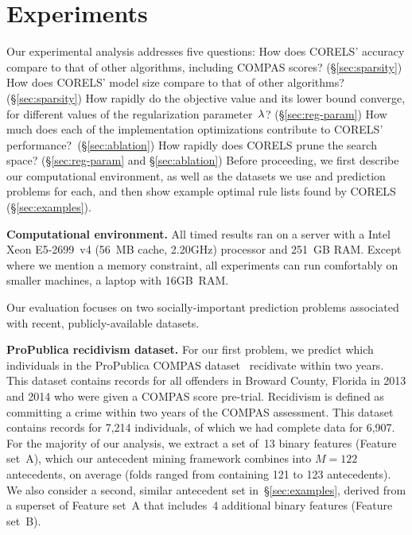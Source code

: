 \section{Experiments}
\label{sec:experiments}

Our experimental analysis addresses five questions:
%
How does CORELS' accuracy compare to that of other algorithms,
including COMPAS scores? (\S\ref{sec:sparsity})
%
How does CORELS' model size compare to that of other algorithms? (\S\ref{sec:sparsity})
%
How rapidly do the objective value and its lower bound converge,
for different values of the regularization parameter~${\lambda}$? (\S\ref{sec:reg-param})
%
How much does each of the implementation optimizations contribute to CORELS' performance?~(\S\ref{sec:ablation})
%
How rapidly does CORELS prune the search space? (\S\ref{sec:reg-param} and \S\ref{sec:ablation})
%
Before proceeding, we first describe our computational environment,
as well as the datasets we use and prediction problems for each,
and then show example optimal rule lists found by CORELS (\S\ref{sec:examples}).

\textbf{Computational environment.}
All timed results ran on a server with a Intel Xeon E5-2699~v4 (56~MB cache, 2.20GHz) processor and 251~GB RAM.
%
Except where we mention a memory constraint, all experiments
can run comfortably on smaller machines, \eg a laptop with 16GB~RAM.

Our evaluation focuses on two socially-important prediction problems associated
with recent, publicly-available datasets.

\textbf{ProPublica recidivism dataset.}
For our first problem, we predict which individuals in the ProPublica COMPAS
dataset~\citep{LarsonMaKiAn16} recidivate within two years.
This dataset contains records for all offenders in Broward County, Florida
in 2013 and 2014 who were given a COMPAS score pre-trial.
Recidivism is defined as committing a crime within two years of the COMPAS
assessment.
This dataset contains records for 7,214 individuals, of which we had complete data for 6,907.
%
For the majority of our analysis, we extract a set of~13 binary features (Feature set~A),
which our antecedent mining framework combines into ${M=122}$ antecedents,
on average (folds ranged from containing 121 to 123 antecedents).
%
We also consider a second, similar antecedent set in~\S\ref{sec:examples},
derived from a superset of Feature set~A that includes~4 additional binary features (Feature set~B).


